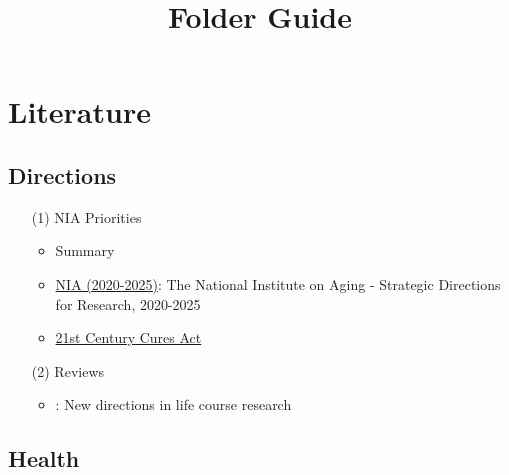\documentclass[12pt]{article}
\title{\huge{Folder Guide}}
\author{}
\date{}
\begin{document}
\maketitle
\tableofcontents
\thispagestyle{empty}





\newpage
\pagestyle{plain}

\section{Literature}
\subsection{Directions}
\begin{itemize}
    \item[(1)] NIA Priorities
    \begin{itemize}
        \item Summary
        \item \href{https://www.nia.nih.gov/about/aging-strategic-directions-research}{NIA (2020-2025)}: The National Institute on Aging - Strategic Directions for Research, 2020-2025
        \item \href{https://www.fda.gov/regulatory-information/selected-amendments-fdc-act/21st-century-cures-act}{21st Century Cures Act}
    \end{itemize}
    \item[(2)] Reviews 
    \begin{itemize}
        \item \citet{mayer2009new}: New directions in life course research
    \end{itemize}
\end{itemize}



\subsection{Health}
\end{document}
